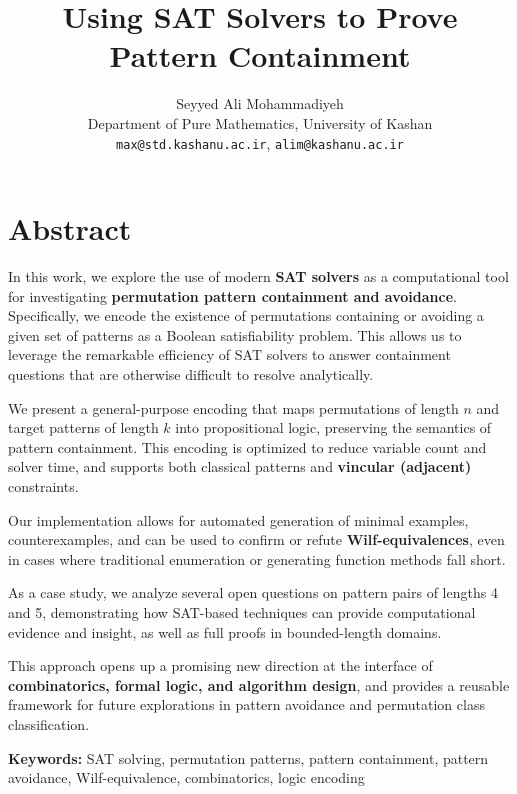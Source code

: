 \documentclass[11pt]{article}
\title{\textbf{Using SAT Solvers to Prove Pattern Containment}}
\author{Seyyed Ali Mohammadiyeh \\
	Department of Pure Mathematics, University of Kashan \\
	\texttt{max@std.kashanu.ac.ir}, \texttt{alim@kashanu.ac.ir}
	}
\date{}
\begin{document}
	
	\maketitle
	
	\vspace{-1.5em}
	\section*{Abstract}
	
	In this work, we explore the use of modern \textbf{SAT solvers} as a computational tool for investigating \textbf{permutation pattern containment and avoidance}. Specifically, we encode the existence of permutations containing or avoiding a given set of patterns as a Boolean satisfiability problem. This allows us to leverage the remarkable efficiency of SAT solvers to answer containment questions that are otherwise difficult to resolve analytically.
	
	\medskip
	
	We present a general-purpose encoding that maps permutations of length $n$ and target patterns of length $k$ into propositional logic, preserving the semantics of pattern containment. This encoding is optimized to reduce variable count and solver time, and supports both classical patterns and \textbf{vincular (adjacent)} constraints.
	
	\medskip
	
	Our implementation allows for automated generation of minimal examples, counterexamples, and can be used to confirm or refute \textbf{Wilf-equivalences}, even in cases where traditional enumeration or generating function methods fall short.
	
	\medskip
	
	As a case study, we analyze several open questions on pattern pairs of lengths 4 and 5, demonstrating how SAT-based techniques can provide computational evidence and insight, as well as full proofs in bounded-length domains.
	
	\medskip
	
	This approach opens up a promising new direction at the interface of \textbf{combinatorics, formal logic, and algorithm design}, and provides a reusable framework for future explorations in pattern avoidance and permutation class classification.
	
	\vfill
	\noindent
	\textbf{Keywords:} SAT solving, permutation patterns, pattern containment, pattern avoidance, Wilf-equivalence, combinatorics, logic encoding
	
\end{document}
